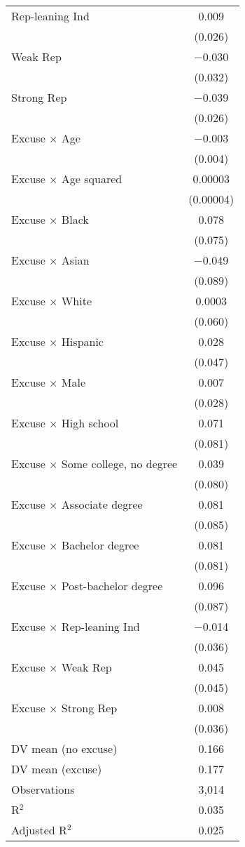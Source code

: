 \begin{center}
\begin{ThreePartTable}
\begin{longtable}{lc}
 \addlinespace 
 Rep-leaning Ind & 0.009 \\ 
  & (0.026) \\ 
 \addlinespace 
 Weak Rep & $-$0.030 \\ 
  & (0.032) \\ 
 \addlinespace 
 Strong Rep & $-$0.039 \\ 
  & (0.026) \\ 
 \addlinespace 
 Excuse $\times$ Age & $-$0.003 \\ 
  & (0.004) \\ 
 \addlinespace 
 Excuse $\times$ Age squared & 0.00003 \\ 
  & (0.00004) \\ 
 \addlinespace 
 Excuse $\times$ Black & 0.078 \\ 
  & (0.075) \\ 
 \addlinespace 
 Excuse $\times$ Asian & $-$0.049 \\ 
  & (0.089) \\ 
 \addlinespace 
 Excuse $\times$ White & 0.0003 \\ 
  & (0.060) \\ 
 \addlinespace 
 Excuse $\times$ Hispanic & 0.028 \\ 
  & (0.047) \\ 
 \addlinespace 
 Excuse $\times$ Male & 0.007 \\ 
  & (0.028) \\ 
 \addlinespace 
 Excuse $\times$ High school & 0.071 \\ 
  & (0.081) \\ 
 \addlinespace 
 Excuse $\times$ Some college, no degree & 0.039 \\ 
  & (0.080) \\ 
 \addlinespace 
 Excuse $\times$ Associate degree & 0.081 \\ 
  & (0.085) \\ 
 \addlinespace 
 Excuse $\times$ Bachelor degree & 0.081 \\ 
  & (0.081) \\ 
 \addlinespace 
 Excuse $\times$ Post-bachelor degree & 0.096 \\ 
  & (0.087) \\ 
 \addlinespace 
 Excuse $\times$ Rep-leaning Ind & $-$0.014 \\ 
  & (0.036) \\ 
 \addlinespace 
 Excuse $\times$ Weak Rep & 0.045 \\ 
  & (0.045) \\ 
 \addlinespace 
 Excuse $\times$ Strong Rep & 0.008 \\ 
  & (0.036) \\ 
 \addlinespace 
DV mean (no excuse) & 0.166 \\
DV mean (excuse) & 0.177 \\
 \addlinespace 
\midrule  
Observations & 3,014 \\ 
R$^{2}$ & 0.035 \\ 
Adjusted R$^{2}$ & 0.025 \\ 
\end{longtable}
\end{ThreePartTable}
\end{center}
